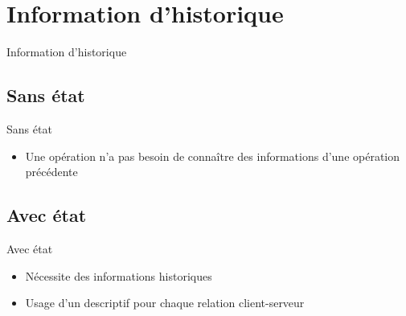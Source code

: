 \def\sectitle{Information d'historique}
\section{\sectitle}
\begin{frame}{\sectitle}
    \def\subsectitle{Sans état}
    \subsection{\subsectitle}
    \begin{block}{\subsectitle}
        \begin{itemize}
            \item Une opération n'a pas besoin de connaître des informations
                d'une opération précédente
        \end{itemize}
    \end{block}
    \def\subsectitle{Avec état}
    \subsection{\subsectitle}
    \begin{block}{\subsectitle}
        \begin{itemize}
            \item Nécessite des informations historiques
            \item Usage d'un descriptif pour chaque relation client-serveur
        \end{itemize}
    \end{block}
\end{frame}


